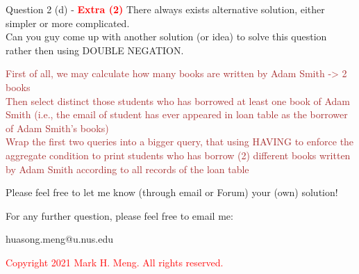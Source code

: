 \begin{frame}[fragile]{Question 2 (d) - \textcolor{red}{\textbf{Extra (2)}}}
There always exists alternative solution, either simpler or more complicated.\\ \vspace{5pt}
Can you guy come up with another solution (or idea) to solve this question rather then using DOUBLE NEGATION.\\\vspace{5pt}

\textcolor{brown}{First of all, we may calculate how many books are written by Adam Smith -> 2 books}\\\vspace{5pt}
\textcolor{brown}{Then select distinct those students who has borrowed at least one book of Adam Smith (i.e., the email of student has ever appeared in loan table as the borrower of Adam Smith's books)}\\\vspace{5pt}
\textcolor{brown}{Wrap the first two queries into a bigger query, that using HAVING to enforce the aggregate condition to print students who has borrow (2) different books written by Adam Smith according to all records of the loan table}

Please feel free to let me know (through email or Forum) your (own) solution!
\end{frame}

\begin{frame}{}
	\centering  
	For any further question, please feel free to email me:\vspace{10pt}
	
	huasong.meng@u.nus.edu \vspace{20pt}
	
	\begin{tcolorbox}
		\begin{center}
			\textcolor{red}{Copyright 2021 Mark H. Meng. All rights reserved.}
		\end{center}
	\end{tcolorbox}
\end{frame}